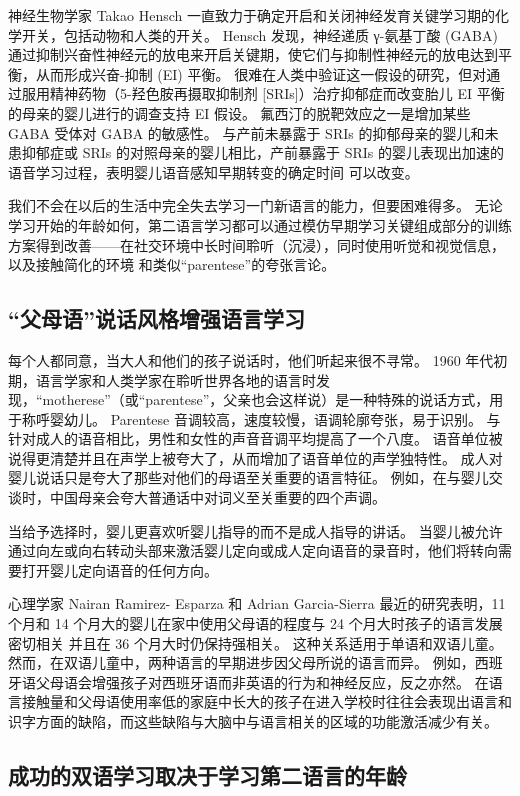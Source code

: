 神经生物学家 Takao Hensch 一直致力于确定开启和关闭神经发育关键学习期的化学开关，包括动物和人类的开关。 Hensch 发现，神经递质 γ-氨基丁酸 (GABA) 通过抑制兴奋性神经元的放电来开启关键期，使它们与抑制性神经元的放电达到平衡，从而形成兴奋-抑制 (EI) 平衡。 很难在人类中验证这一假设的研究，但对通过服用精神药物（5-羟色胺再摄取抑制剂 [SRIs]）治疗抑郁症而改变胎儿 EI 平衡的母亲的婴儿进行的调查支持 EI 假设。 氟西汀的脱靶效应之一是增加某些 GABA 受体对 GABA 的敏感性。 与产前未暴露于 SRIs 的抑郁母亲的婴儿和未患抑郁症或 SRIs 的对照母亲的婴儿相比，产前暴露于 SRIs 的婴儿表现出加速的语音学习过程，表明婴儿语音感知早期转变的确定时间 可以改变。

我们不会在以后的生活中完全失去学习一门新语言的能力，但要困难得多。 无论学习开始的年龄如何，第二语言学习都可以通过模仿早期学习关键组成部分的训练方案得到改善——在社交环境中长时间聆听（沉浸），同时使用听觉和视觉信息，以及接触简化的环境 和类似“parentese”的夸张言论。

\subsection{“父母语”说话风格增强语言学习}
每个人都同意，当大人和他们的孩子说话时，他们听起来很不寻常。 1960 年代初期，语言学家和人类学家在聆听世界各地的语言时发现，“motherese”（或“parentese”，父亲也会这样说）是一种特殊的说话方式，用于称呼婴幼儿。 Parentese 音调较高，速度较慢，语调轮廓夸张，易于识别。 与针对成人的语音相比，男性和女性的声音音调平均提高了一个八度。 语音单位被说得更清楚并且在声学上被夸大了，从而增加了语音单位的声学独特性。 成人对婴儿说话只是夸大了那些对他们的母语至关重要的语言特征。 例如，在与婴儿交谈时，中国母亲会夸大普通话中对词义至关重要的四个声调。

当给予选择时，婴儿更喜欢听婴儿指导的而不是成人指导的讲话。 当婴儿被允许通过向左或向右转动头部来激活婴儿定向或成人定向语音的录音时，他们将转向需要打开婴儿定向语音的任何方向。

心理学家 Nairan Ramirez- Esparza 和 Adrian Garcia-Sierra 最近的研究表明，11 个月和 14 个月大的婴儿在家中使用父母语的程度与 24 个月大时孩子的语言发展密切相关 并且在 36 个月大时仍保持强相关。 这种关系适用于单语和双语儿童。 然而，在双语儿童中，两种语言的早期进步因父母所说的语言而异。 例如，西班牙语父母语会增强孩子对西班牙语而非英语的行为和神经反应，反之亦然。 在语言接触量和父母语使用率低的家庭中长大的孩子在进入学校时往往会表现出语言和识字方面的缺陷，而这些缺陷与大脑中与语言相关的区域的功能激活减少有关。

\subsection{成功的双语学习取决于学习第二语言的年龄}

